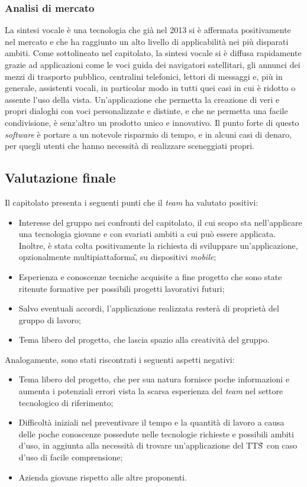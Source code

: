 \subsubsection{Analisi di mercato}
La sintesi vocale è una tecnologia che già nel 2013 si è affermata positivamente nel mercato e che ha raggiunto un alto livello di applicabilità nei più disparati ambiti. Come sottolineato nel capitolato, la sintesi vocale si è diffusa rapidamente grazie ad applicazioni come le voci guida dei navigatori satellitari, gli annunci dei mezzi di trasporto pubblico, centralini telefonici, lettori di messaggi e, più in generale, assistenti vocali, in particolar modo in tutti quei casi in cui è ridotto o assente l'uso della vista. Un'applicazione che permetta la creazione di veri e propri dialoghi con voci personalizzate e distinte, e che ne permetta una facile condivisione, è senz'altro un prodotto unico e innovativo. Il punto forte di questo \textit{software} è portare a un notevole risparmio di tempo, e in alcuni casi di denaro, per quegli utenti che hanno necessità di realizzare sceneggiati propri.

\subsection{Valutazione finale}
Il capitolato presenta i seguenti punti che il \textit{team} ha valutato positivi:
\begin{itemize}
\item Interesse del gruppo nei confronti del capitolato, il cui scopo sta nell'applicare una tecnologia giovane e con svariati ambiti a cui può essere applicata. Inoltre, è stata colta positivamente la richiesta di sviluppare un'applicazione, opzionalmente multipiattaforma\G, su dispositivi \textit{mobile};
\item Esperienza e conoscenze tecniche acquisite a fine progetto che sono state ritenute formative per possibili progetti lavorativi futuri;
\item Salvo eventuali accordi, l'applicazione realizzata resterà di proprietà del gruppo di lavoro;
\item Tema libero del progetto, che lascia spazio alla creatività del gruppo.
\end{itemize}
Analogamente, sono stati riscontrati i seguenti aspetti negativi:
\begin{itemize}
\item Tema libero del progetto, che per sua natura fornisce poche informazioni e aumenta i potenziali errori vista la scarsa esperienza del \textit{team} nel settore tecnologico di riferimento;
\item Difficoltà iniziali nel preventivare il tempo e la quantità di lavoro a 
causa delle poche conoscenze possedute nelle tecnologie richieste e 
possibili ambiti d'uso, in aggiunta alla necessità di trovare un'applicazione 
del TTS\G\, con caso d'uso di facile comprensione;
\item Azienda giovane rispetto alle altre proponenti.
\end{itemize}

\newpage